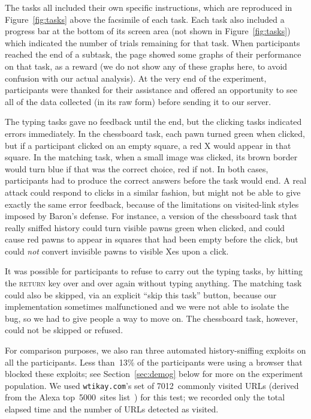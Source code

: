 \documentclass[conference]{IEEEtran}
\begin{document}
\noindent
The tasks all included their own specific instructions, which are
reproduced in Figure~\ref{fig:tasks} above the facsimile of each task.
Each task also included a progress bar at the bottom of its screen
area (not shown in Figure~\ref{fig:tasks}) which indicated the number
of trials remaining for that task.  When participants reached the end
of a subtask, the page showed some graphs of their performance on that
task, as a reward (we do not show any of these graphs here, to avoid
confusion with our actual analysis).  At the very end of the
experiment, participants were thanked for their assistance and offered
an opportunity to see all of the data collected (in its raw form)
before sending it to our server.

The typing tasks gave no feedback until the end, but the clicking
tasks indicated errors immediately.  In the chessboard task, each pawn
turned green when clicked, but if a participant clicked on an empty
square, a red X would appear in that square.  In the matching task,
when a small image was clicked, its brown border would turn blue if
that was the correct choice, red if not.  In both cases, participants
had to produce the correct answers before the task would end.  A real
attack could respond to clicks in a similar fashion, but might not be
able to give exactly the same error feedback, because of the
limitations on visited-link styles imposed by Baron's defense.  For
instance, a version of the chessboard task that really sniffed history
could turn visible pawns green when clicked, and could cause red pawns
to appear in squares that had been empty before the click, but could
\emph{not} convert invisible pawns to visible Xes upon a click.

It was possible for participants to refuse to carry out the typing
tasks, by hitting the \textsc{return} key over and over again without
typing anything.  The matching task could also be skipped, via an
explicit “skip this task” button, because our implementation sometimes
malfunctioned and we were not able to isolate the bug, so we had to
give people a way to move on.  The chessboard task, however, could not
be skipped or refused.

For comparison purposes, we also ran three automated history-sniffing
exploits on all the participants.  Less than~13\% of the participants
were using a browser that blocked these exploits; see
Section~\ref{sec:demog} below for more on the experiment population.
We used \texttt{wtikay.com}'s set of 7012~commonly visited URLs
(derived from the Alexa top~5000~sites list~\cite{janc10wtikay,alexa})
for this test; we recorded only the total elapsed time and the number
of URLs detected as visited.
\end{document}

